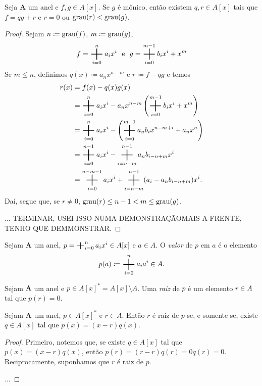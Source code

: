 \begin{prop}
Seja $\bm A$ um anel e $f,g \in A[x]$. Se $g$ é mônico, então existem $q,r \in A[x]$ tais que $f=qg+r$ e $r=0$ ou $\operatorname{grau}(r) < \operatorname{grau}(g)$.
\end{prop}
\begin{proof}
Sejam $n \coloneqq \operatorname{grau}(f)$, $m \coloneqq \operatorname{grau}(g)$,
	\begin{equation*}
	f = \bigplus_{i=0}^n a_ix^i \e g = \bigplus_{i=0}^{m-1} b_ix^i + x^m
	\end{equation*}
Se $m \leq n$, definimos $q(x) \coloneqq a_nx^{n-m}$ e $r \coloneqq f-qg$ e temos
	\begin{align*}
	r(x) &= f(x) - q(x)g(x) \\
	&= \bigplus_{i=0}^n a_ix^i - a_nx^{n-m}\left(\bigplus_{i=0}^{m-1} b_ix^i + x^m\right) \\
	&= \bigplus_{i=0}^n a_ix^i - \left(\bigplus_{i=0}^{m-1} a_nb_ix^{n-m+i} + a_nx^n\right) \\
	&= \bigplus_{i=0}^{n-1} a_ix^i - \bigplus_{i=n-m}^{n-1} a_nb_{i-n+m}x^i \\
	&= \bigplus_{i=0}^{n-m-1} a_ix^i + \bigplus_{i=n-m}^{n-1} (a_i - a_nb_{i-n+m})x^i.
	\end{align*}
Daí, segue que, se $r \neq 0$, $\operatorname{grau}(r) \leq n-1 < m  \leq \operatorname{grau}(g)$.

... TERMINAR, USEI ISSO NUMA DEMONSTRAÇÃOMAIS A FRENTE, TENHO QUE DEMMONSTRAR.
\end{proof}

\begin{defi}
	Sejam $\bm A$ um anel, $p = \bigplus_{i=0}^n a_ix^i \in A[x]$ e $a \in A$. O \emph{valor} de $p$ em $a$ é o elemento
	\begin{equation*}
	p(a) \coloneqq \bigplus_{i=0}^n a_ia^i \in A.
	\end{equation*}
\end{defi}

\begin{defi}
	Sejam $\bm A$ um anel e $p \in A[x]^* = A[x] \setminus A$. Uma \emph{raiz} de $p$ é um elemento $r \in A$ tal que $p(r)=0$.
\end{defi}

\begin{prop}
	Sejam $\bm A$ um anel, $p \in A[x]^*$ e $r \in A$. Então $r$ é raiz de $p$ se, e somente se, existe $q \in A[x]$ tal que $p(x)=(x-r)q(x)$.
\end{prop}
\begin{proof}
	Primeiro, notemos que, se existe $q \in A[x]$ tal que $p(x)=(x-r)q(x)$, então $p(r)=(r-r)q(r)=0q(r)=0$. Reciprocamente, suponhamos que $r$ é raiz de $p$.

	...
\end{proof}

